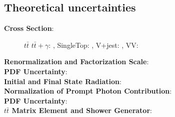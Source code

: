 \subsection{Theoretical uncertainties}
\begin{description}
\item[\textbf{Cross Section}:]  $t\bar{t}$ \cite{ttXSec} $t\bar{t}+\gamma$: \cite{ATLAS:2018pmj}, SingleTop: \cite{SingleTopXSec}, V+jest: \cite{VXSec}, VV:\cite{VXSec}
\item[\textbf{Renormalization and Factorization Scale}:]  
\item[\textbf{PDF Uncertainty}:]  
\item[\textbf{Initial and Final State Radiation}:] 
\item[\textbf{Normalization of Prompt Photon Contribution}:]  
\item[\textbf{PDF Uncertainty}:]  
\item[\textbf{$t\bar{t}$ Matrix Element and Shower Generator}:]  
\end{description}

